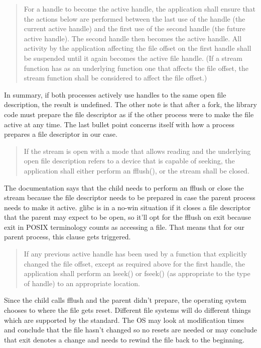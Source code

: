 \begin{quote}
For a handle to become the active handle, the application shall ensure that the actions below are performed between the last use of the handle (the current active handle) and the first use of the second handle (the future active handle). The second handle then becomes the active handle. All activity by the application affecting the file offset on the first handle shall be suspended until it again becomes the active file handle. (If a stream function has as an underlying function one that affects the file offset, the stream function shall be considered to affect the file offset.)
\end{quote}

In summary, if both processes actively use handles to the same open file description, the result is undefined.
The other note is that after a fork, the library code must prepare the file descriptor as if the other process were to make the file active at any time.
The last bullet point concerns itself with how a process prepares a file descriptor in our case.

\begin{quote}
If the stream is open with a mode that allows reading and the underlying open file description refers to a device that is capable of seeking, the application shall either perform an fflush(), or the stream shall be closed.
\end{quote}

The documentation says that the child needs to perform an fflush or close the stream because the file descriptor needs to be prepared in case the parent process needs to make it active.
glibc is in a no-win situation if it closes a file descriptor that the parent may expect to be open, so it'll opt for the fflush on exit because exit in POSIX terminology counts as accessing a file.
That means that for our parent process, this clause gets triggered.

\begin{quote}
If any previous active handle has been used by a function that explicitly changed the file offset, except as required above for the first handle, the application shall perform an lseek() or fseek() (as appropriate to the type of handle) to an appropriate location.
\end{quote}

Since the child calls fflush and the parent didn't prepare, the operating system chooses to where the file gets reset.
Different file systems will do different things which are supported by the standard.
The OS may look at modification times and conclude that the file hasn't changed so no resets are needed or may conclude that exit denotes a change and needs to rewind the file back to the beginning.


